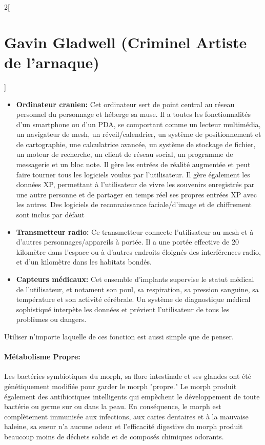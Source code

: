 \documentclass[a4paper,9pt]{article}
\begin{document}
\begin{multicols}{2}[\section*{Gavin Gladwell (Criminel Artiste de l'arnaque)}]
   \begin{itemize}
      \item \textbf{Ordinateur cranien:} Cet ordinateur sert de point central au
         réseau personnel du personnage et héberge sa muse. Il a toutes
         les fonctionnalités d'un smartphone ou d'un PDA, se comportant comme un
         lecteur multimédia, un navigateur de mesh, un réveil/calendrier, un
         système de positionnement et de cartographie, une calculatrice avancée,
         un système de stockage de fichier, un moteur de recherche, un client de
         réseau social, un programme de messagerie et un bloc note. Il gère les
         entrées de réalité augmentée et peut faire tourner tous les logiciels
         voulus par l'utilisateur. Il gère également les données XP, permettant à
         l'utilisateur de vivre les souvenirs enregistrés par une autre personne et
         de partager en temps réel ses propres entrées XP avec les autres. Des
         logiciels de reconnaissance faciale/d'image et de chiffrement
         sont inclus par défaut
      \item \textbf{Transmetteur radio:} Ce transmetteur connecte l'utilisateur au
         mesh et à d'autres personnages/appareils à portée. Il a une portée
         effective de 20 kilomètre dans l'espace ou à d'autres endroits éloignés
         des interférences radio, et d'un kilomètre dans les habitats bondés.
      \item \textbf{Capteurs médicaux:} Cet ensemble d'implants supervise le
         statut médical de l'utilisateur, et notament son poul, sa respiration, sa
         pression sanguine, sa température et son activité cérébrale. Un système de
         diagnostique médical sophistiqué interpète les données et prévient
         l'utilisateur de tous les problèmes ou dangers.
   \end{itemize} 

   Utiliser n'importe laquelle de ces fonction est aussi simple que de penser.

   \paragraph{Métabolisme Propre:} Les bactéries symbiotiques du morph, sa flore
   intestinale et ses glandes ont été génétiquement modifiée pour garder le morph
   "propre." Le morph produit également des antibiotiques intelligents qui empèchent
   le développement de toute bactérie ou germe sur ou dans la peau. En
   conséquence, le morph est complètement immunisée aux infections, aux caries
   dentaires et à la mauvaise haleine, sa sueur n'a aucune odeur et l'efficacité
   digestive du morph produit beaucoup moins de déchets solide et de composés
   chimiques odorants.


\end{multicols}
\end{document}
